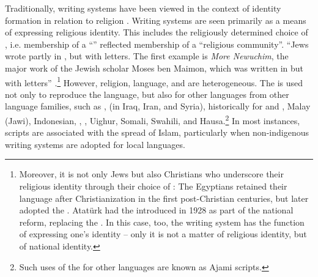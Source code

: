 \documentclass[output=paper,colorlinks,citecolor=brown,arabicfont,georgian]{langscibook}
\begin{document}
Traditionally, writing systems have been viewed in the context of identity formation in relation to religion \citep{haarmann1990}. Writing systems are seen primarily as a means of expressing religious identity. This includes the religiously determined choice of , i.e. membership of a ``'' reflected membership of a ``religious community''. ``Jews wrote partly in , but with  letters. The first example is \textit{More Newuchim}, the major work of the Jewish scholar Moses ben Maimon, which was written in  but with  letters'' \citep[524]{oppenheimer1971}.\footnote{%
Moreover, it is not only Jews but also Christians who underscore their religious identity through their choice of : The Egyptians retained their language after Christianization in the first post-Christian centuries, but later adopted the   \citep[79]{metzger1966}. Atatürk had the   introduced in 1928 as part of the  national reform, replacing the  . In this case, too, the writing system has the function of expressing one's identity -- only it is not a matter of religious identity, but of national identity.} However, religion, language, and  are heterogeneous. The   is used not only to reproduce the  language, but also for other languages from other language families, such as ,  (in Iraq, Iran, and Syria), historically for  and , Malay (Jawi), Indonesian, , , Uighur, Somali, Swahili, and Hausa.\footnote{%
Such uses of the   for other languages are known as Ajami scripts.} In most instances, scripts are associated with the spread of Islam, particularly when non-indigenous writing systems are adopted for local languages. 
\end{document}
